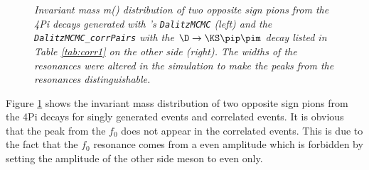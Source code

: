 \begin{figure}[!h]
\vspace*{-0.cm}
  \begin{center}
  \vspace*{-1.0cm}
  \end{center}
  \caption{\textit{Invariant mass m(\pip \pim) distribution of two opposite sign pions from the \DTo4Pi decays generated with \mint 's \texttt{DalitzMCMC} (left) and the \texttt{DalitzMCMC\_corrPairs} with the $\D \rightarrow \KS \pip \pim$ decay listed in Table \ref{tab:corr1} on the other side (right). The widths of the resonances were altered in the simulation to make the peaks from the resonances distinguishable.}}
  \label{fig:corr1}
\end{figure}

Figure \ref{fig:corr1} shows the invariant mass distribution of two opposite sign pions from the \DTo4Pi decays for singly generated events and correlated events. It is obvious that the peak from the $f_0$ does not appear in the correlated events. This is due to the fact that the $f_0$ resonance comes from a \CP even amplitude which is forbidden by setting the amplitude of the other side \D meson to \CP even only.\\

